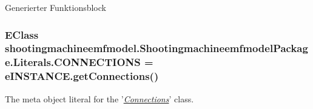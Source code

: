 Generierter Funktionsblock \hypertarget{interfaceshootingmachineemfmodel_1_1_shootingmachineemfmodel_package_1_1_literals_a9c8a1d573b9fd4d43bc01144a0a93f1f}{
\subsubsection[{C\-O\-N\-N\-E\-C\-T\-I\-O\-N\-S}]{\setlength{\rightskip}{0pt plus 5cm}E\-Class shootingmachineemfmodel.\-Shootingmachineemfmodel\-Package.\-Literals.\-C\-O\-N\-N\-E\-C\-T\-I\-O\-N\-S = e\-I\-N\-S\-T\-A\-N\-C\-E.\-get\-Connections()}}\label{interfaceshootingmachineemfmodel_1_1_shootingmachineemfmodel_package_1_1_literals_a9c8a1d573b9fd4d43bc01144a0a93f1f}
The meta object literal for the '\hyperlink{classshootingmachineemfmodel_1_1impl_1_1_connections_impl}{{\itshape Connections}}' class.

